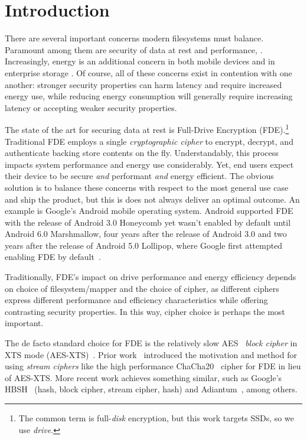 \section{Introduction}\label{sec:introduction}

There are several important concerns modern filesystems must balance. Paramount
among them are security of data at rest and performance, . Increasingly, energy is an additional concern in both mobile
devices \cite{android-M-mobile-motivation} and in enterprise storage
\cite{enterprise-motivation}. Of course, all of these concerns exist in
contention with one another: stronger security properties can harm latency and
require increased energy use, while reducing energy consumption will generally
require increasing latency or accepting weaker security properties.

The state of the art for securing data at rest is Full-Drive Encryption
(FDE).\footnote{The common term is full-\emph{disk} encryption, but this work
targets SSDs, so we use \emph{drive}.} Traditional FDE employs a single
\emph{cryptographic cipher} to encrypt, decrypt, and authenticate backing store
contents on the fly. Understandably, this process impacts system performance and
energy use considerably. Yet, end users expect their device to be secure
\emph{and} performant \emph{and} energy efficient. The obvious solution is to
balance these concerns with respect to the most general use case and ship the
product, but this is does not always deliver an optimal outcome. An example is
Google's Android mobile operating system. Android supported FDE with the release
of Android 3.0 Honeycomb yet wasn't enabled by default until Android 6.0
Marshmallow, four years after the release of Android 3.0 and two years after the
release of Android 5.0 Lollipop, where Google first attempted enabling FDE by
default~\cite{android-M-mobile-motivation}.

Traditionally, FDE's impact on drive performance and energy efficiency depends
on choice of filesystem/mapper and the choice of cipher, as different ciphers
express different performance and efficiency characteristics while offering
contrasting security properties. In this way, cipher choice is perhaps the most
important.

The de facto standard choice for FDE is the relatively slow AES~\cite{AES}
\emph{block cipher} in XTS mode (AES-XTS)~\cite{AES-XTS}. Prior
work~\cite{StrongBox} introduced the motivation and method for using
\emph{stream ciphers} like the high performance ChaCha20~\cite{ChaCha20} cipher
for FDE in lieu of AES-XTS. More recent work achieves something similar, such as
Google's HBSH~\cite{HBSH} (hash, block cipher, stream cipher, hash) and
Adiantum~\cite{Adiantum}, among others.

